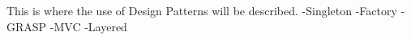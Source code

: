 This is where the use of Design Patterns will be described.
-Singleton
-Factory
-GRASP
-MVC
-Layered


